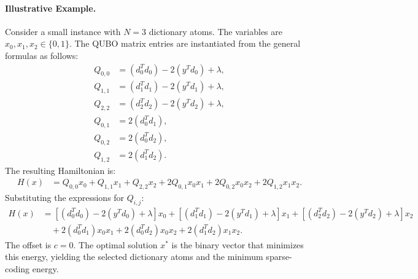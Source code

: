\documentclass[12pt]{article}
\begin{document}
\paragraph{Illustrative Example.}
Consider a small instance with $N=3$ dictionary atoms. The variables are $x_0, x_1, x_2 \in \{0,1\}$. The QUBO matrix entries are instantiated from the general formulas as follows:
\begin{align}
    Q_{0,0} &= (d_0^T d_0) - 2 (y^T d_0) + \lambda, \\
    Q_{1,1} &= (d_1^T d_1) - 2 (y^T d_1) + \lambda, \\
    Q_{2,2} &= (d_2^T d_2) - 2 (y^T d_2) + \lambda, \\
    Q_{0,1} &= 2 (d_0^T d_1), \\
    Q_{0,2} &= 2 (d_0^T d_2), \\
    Q_{1,2} &= 2 (d_1^T d_2).
\end{align}
The resulting Hamiltonian is:
\begin{align}
    H(x) &= Q_{0,0} x_0 + Q_{1,1} x_1 + Q_{2,2} x_2 + 2 Q_{0,1} x_0 x_1 + 2 Q_{0,2} x_0 x_2 + 2 Q_{1,2} x_1 x_2.
\end{align}
Substituting the expressions for $Q_{i,j}$:
\begin{align}
    H(x) &= \left[ (d_0^T d_0) - 2 (y^T d_0) + \lambda \right] x_0 + \left[ (d_1^T d_1) - 2 (y^T d_1) + \lambda \right] x_1 + \left[ (d_2^T d_2) - 2 (y^T d_2) + \lambda \right] x_2 \nonumber \\
    &\quad + 2 (d_0^T d_1) x_0 x_1 + 2 (d_0^T d_2) x_0 x_2 + 2 (d_1^T d_2) x_1 x_2.
\end{align}
The offset is $c=0$. The optimal solution $x^*$ is the binary vector that minimizes this energy, yielding the selected dictionary atoms and the minimum sparse-coding energy.
\end{document}
